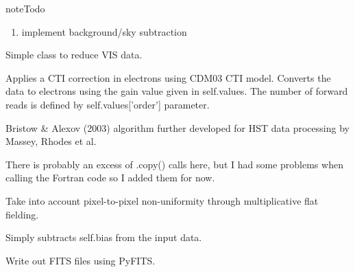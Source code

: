 \documentclass[a4paper,11pt,english]{sphinxmanual}
\begin{document}
\begin{notice}{note}{Todo}
\begin{enumerate}
\item {} 
implement background/sky subtraction

\end{enumerate}
\end{notice}

\begin{fulllineitems}
\label{reduction:reduction.reduceVISdata.reduceVISdata}
Simple class to reduce VIS data.

\begin{fulllineitems}
\label{reduction:reduction.reduceVISdata.reduceVISdata.applyCTICorrection}
Applies a CTI correction in electrons using CDM03 CTI model.
Converts the data to electrons using the gain value given in self.values.
The number of forward reads is defined by self.values{[}'order'{]} parameter.

Bristow \& Alexov (2003) algorithm further developed for HST data
processing by Massey, Rhodes et al.

There is probably an excess of .copy() calls here, but I had some problems
when calling the Fortran code so I added them for now.

\end{fulllineitems}


\begin{fulllineitems}
\label{reduction:reduction.reduceVISdata.reduceVISdata.flatfield}
Take into account pixel-to-pixel non-uniformity through multiplicative flat fielding.

\end{fulllineitems}


\begin{fulllineitems}
\label{reduction:reduction.reduceVISdata.reduceVISdata.subtractBias}
Simply subtracts self.bias from the input data.

\end{fulllineitems}


\begin{fulllineitems}
\label{reduction:reduction.reduceVISdata.reduceVISdata.writeFITSfile}
Write out FITS files using PyFITS.

\end{fulllineitems}


\end{fulllineitems}
\end{document}
